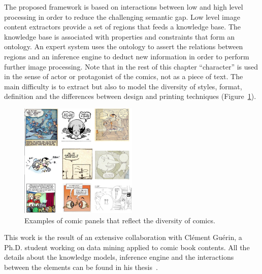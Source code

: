 The proposed framework is based on interactions between low and high level processing in order to reduce the challenging semantic gap.
Low level image content extractors provide a set of regions that feeds a knowledge base.
The knowledge base is associated with properties and constraints that form an ontology.
An expert system uses the ontology to assert the relations between regions and an inference engine to deduct new information in order to perform further image processing.
Note that in the rest of this chapter ``character'' is used in the sense of actor or protagonist of the comics, not as a piece of text.
The main difficulty is to extract but also to model the diversity of styles, format, definition and the differences between design and printing techniques (Figure~\ref{fig:kn:comics_diversity}).

\begin{figure}[ht]  %
   \centering
  \includegraphics[trim= 4px 0px 0px 0px, clip, width=0.5\textwidth]{comics_diversity.png}
  \caption{Examples of comic panels that reflect the diversity of comics.}
  \label{fig:kn:comics_diversity}
 \end{figure}



This work is the result of an extensive collaboration with Cl{\'e}ment Gu{\'e}rin, a Ph.D. student working on data mining applied to comic book contents. All the details about the knowledge models, inference engine and the interactions between the elements can be found in his thesis~\cite{phdthesisGuerin14}.

